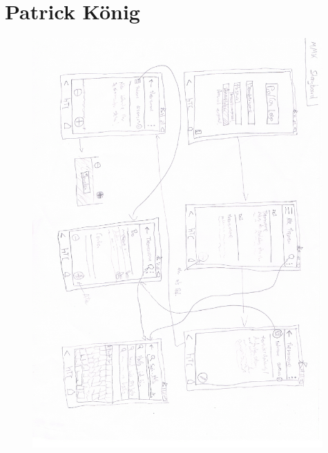 \section{Patrick König}
\label{sec:king}



\begin{figure}
  \vspace{-20pt}
  \begin{center}
    \includegraphics[page=1,width=0.99\textwidth]{./images/entwuerfe/koenig1}
  \end{center}
  \vspace{-40pt}
\end{figure}



